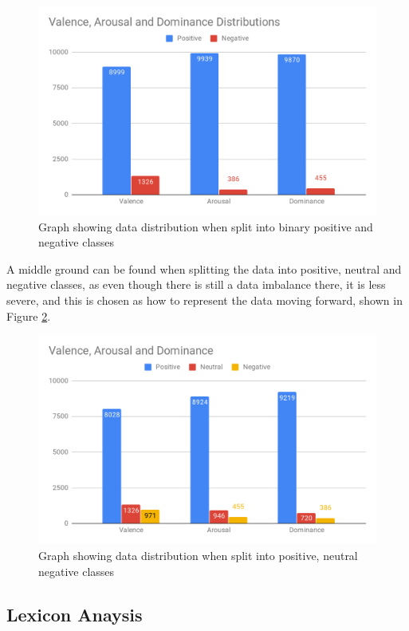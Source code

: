 \begin{figure}[ht]
\centering
\includegraphics[scale=0.25]{graphs/binaryDist.png}
\caption{Graph showing data distribution when split into binary positive and negative classes}
\label{dist:bin}
\end{figure}

A middle ground can be found when splitting the data into positive, neutral and negative classes, as even though there is still a data imbalance there, it is less severe, and this is chosen as how to represent the data moving forward, shown in Figure \ref{dist:tri}.

\begin{figure}[H]
\centering
\includegraphics[scale=0.3]{graphs/nonBinaryDist.png}
\caption{Graph showing data distribution when split into positive, neutral negative classes}
\label{dist:tri}
\end{figure}

\subsection{Lexicon Anaysis}


